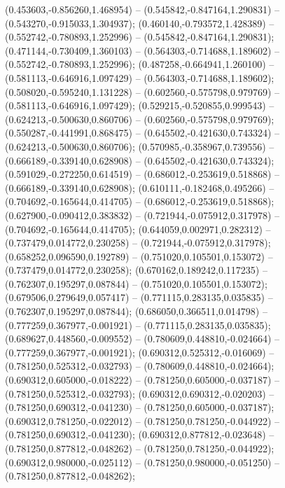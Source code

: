  (0.453603,-0.856260,1.468954) -- (0.545842,-0.847164,1.290831) -- (0.543270,-0.915033,1.304937);
 (0.460140,-0.793572,1.428389) -- (0.552742,-0.780893,1.252996) -- (0.545842,-0.847164,1.290831);
 (0.471144,-0.730409,1.360103) -- (0.564303,-0.714688,1.189602) -- (0.552742,-0.780893,1.252996);
 (0.487258,-0.664941,1.260100) -- (0.581113,-0.646916,1.097429) -- (0.564303,-0.714688,1.189602);
 (0.508020,-0.595240,1.131228) -- (0.602560,-0.575798,0.979769) -- (0.581113,-0.646916,1.097429);
 (0.529215,-0.520855,0.999543) -- (0.624213,-0.500630,0.860706) -- (0.602560,-0.575798,0.979769);
 (0.550287,-0.441991,0.868475) -- (0.645502,-0.421630,0.743324) -- (0.624213,-0.500630,0.860706);
 (0.570985,-0.358967,0.739556) -- (0.666189,-0.339140,0.628908) -- (0.645502,-0.421630,0.743324);
 (0.591029,-0.272250,0.614519) -- (0.686012,-0.253619,0.518868) -- (0.666189,-0.339140,0.628908);
 (0.610111,-0.182468,0.495266) -- (0.704692,-0.165644,0.414705) -- (0.686012,-0.253619,0.518868);
 (0.627900,-0.090412,0.383832) -- (0.721944,-0.075912,0.317978) -- (0.704692,-0.165644,0.414705);
 (0.644059,0.002971,0.282312) -- (0.737479,0.014772,0.230258) -- (0.721944,-0.075912,0.317978);
 (0.658252,0.096590,0.192789) -- (0.751020,0.105501,0.153072) -- (0.737479,0.014772,0.230258);
 (0.670162,0.189242,0.117235) -- (0.762307,0.195297,0.087844) -- (0.751020,0.105501,0.153072);
 (0.679506,0.279649,0.057417) -- (0.771115,0.283135,0.035835) -- (0.762307,0.195297,0.087844);
 (0.686050,0.366511,0.014798) -- (0.777259,0.367977,-0.001921) -- (0.771115,0.283135,0.035835);
 (0.689627,0.448560,-0.009552) -- (0.780609,0.448810,-0.024664) -- (0.777259,0.367977,-0.001921);
 (0.690312,0.525312,-0.016069) -- (0.781250,0.525312,-0.032793) -- (0.780609,0.448810,-0.024664);
 (0.690312,0.605000,-0.018222) -- (0.781250,0.605000,-0.037187) -- (0.781250,0.525312,-0.032793);
 (0.690312,0.690312,-0.020203) -- (0.781250,0.690312,-0.041230) -- (0.781250,0.605000,-0.037187);
 (0.690312,0.781250,-0.022012) -- (0.781250,0.781250,-0.044922) -- (0.781250,0.690312,-0.041230);
 (0.690312,0.877812,-0.023648) -- (0.781250,0.877812,-0.048262) -- (0.781250,0.781250,-0.044922);
 (0.690312,0.980000,-0.025112) -- (0.781250,0.980000,-0.051250) -- (0.781250,0.877812,-0.048262);
